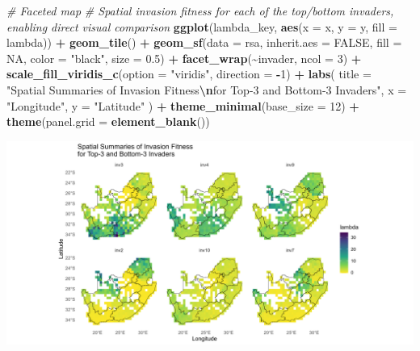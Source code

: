 \documentclass[
]{article}
\newenvironment{Shaded}{\begin{snugshade}}{\end{snugshade}}
\newcommand{\AttributeTok}[1]{\textcolor[rgb]{0.13,0.29,0.53}{#1}}
\newcommand{\CommentTok}[1]{\textcolor[rgb]{0.56,0.35,0.01}{\textit{#1}}}
\newcommand{\ConstantTok}[1]{\textcolor[rgb]{0.56,0.35,0.01}{#1}}
\newcommand{\DecValTok}[1]{\textcolor[rgb]{0.00,0.00,0.81}{#1}}
\newcommand{\FloatTok}[1]{\textcolor[rgb]{0.00,0.00,0.81}{#1}}
\newcommand{\FunctionTok}[1]{\textcolor[rgb]{0.13,0.29,0.53}{\textbf{#1}}}
\newcommand{\NormalTok}[1]{#1}
\newcommand{\SpecialCharTok}[1]{\textcolor[rgb]{0.81,0.36,0.00}{\textbf{#1}}}
\newcommand{\StringTok}[1]{\textcolor[rgb]{0.31,0.60,0.02}{#1}}
\begin{document}
\begin{Shaded}
\begin{Highlighting}[]
\CommentTok{\# Faceted map}
\CommentTok{\# Spatial invasion fitness for each of the top/bottom invaders, enabling direct visual comparison}
\FunctionTok{ggplot}\NormalTok{(lambda\_key, }\FunctionTok{aes}\NormalTok{(}\AttributeTok{x =}\NormalTok{ x, }\AttributeTok{y =}\NormalTok{ y, }\AttributeTok{fill =}\NormalTok{ lambda)) }\SpecialCharTok{+}
  \FunctionTok{geom\_tile}\NormalTok{() }\SpecialCharTok{+}
  \FunctionTok{geom\_sf}\NormalTok{(}\AttributeTok{data =}\NormalTok{ rsa, }\AttributeTok{inherit.aes =} \ConstantTok{FALSE}\NormalTok{, }\AttributeTok{fill =} \ConstantTok{NA}\NormalTok{, }\AttributeTok{color =} \StringTok{"black"}\NormalTok{, }\AttributeTok{size =} \FloatTok{0.5}\NormalTok{) }\SpecialCharTok{+}
  \FunctionTok{facet\_wrap}\NormalTok{(}\SpecialCharTok{\textasciitilde{}}\NormalTok{invader, }\AttributeTok{ncol =} \DecValTok{3}\NormalTok{) }\SpecialCharTok{+}
  \FunctionTok{scale\_fill\_viridis\_c}\NormalTok{(}\AttributeTok{option =} \StringTok{"viridis"}\NormalTok{, }\AttributeTok{direction =} \SpecialCharTok{{-}}\DecValTok{1}\NormalTok{) }\SpecialCharTok{+}
  \FunctionTok{labs}\NormalTok{(}
    \AttributeTok{title =} \StringTok{"Spatial Summaries of Invasion Fitness}\SpecialCharTok{\textbackslash{}n}\StringTok{for Top{-}3 and Bottom{-}3 Invaders"}\NormalTok{,}
    \AttributeTok{x =} \StringTok{"Longitude"}\NormalTok{, }\AttributeTok{y =} \StringTok{"Latitude"}
\NormalTok{  ) }\SpecialCharTok{+}
  \FunctionTok{theme\_minimal}\NormalTok{(}\AttributeTok{base\_size =} \DecValTok{12}\NormalTok{) }\SpecialCharTok{+}
  \FunctionTok{theme}\NormalTok{(}\AttributeTok{panel.grid =} \FunctionTok{element\_blank}\NormalTok{())}
\end{Highlighting}
\end{Shaded}

\includegraphics[width=1\linewidth]{man/figures/README-key-invaders-1}
\end{document}
